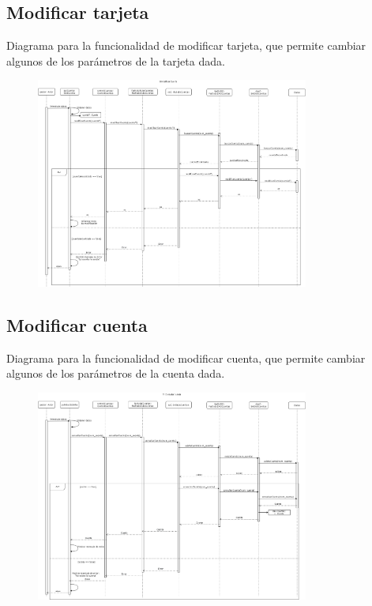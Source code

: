 \documentclass[12pt]{article}
\begin{document}
\subsection{Modificar tarjeta}
Diagrama para la funcionalidad de modificar tarjeta, que permite cambiar algunos de los parámetros de la tarjeta dada.
\begin{figure}[H]
    \centering
    \includegraphics[width=0.8\textwidth]{images/7-Gestor_modifica_tarjeta1.png}
\end{figure}
\subsection{Modificar cuenta}
Diagrama para la funcionalidad de modificar cuenta, que permite cambiar algunos de los parámetros de la cuenta dada.
\begin{figure}[H]
    \centering
    \includegraphics[width=0.8\textwidth]{images/8-Gestor_modifica_cuenta3.png}
\end{figure}
\end{document}
